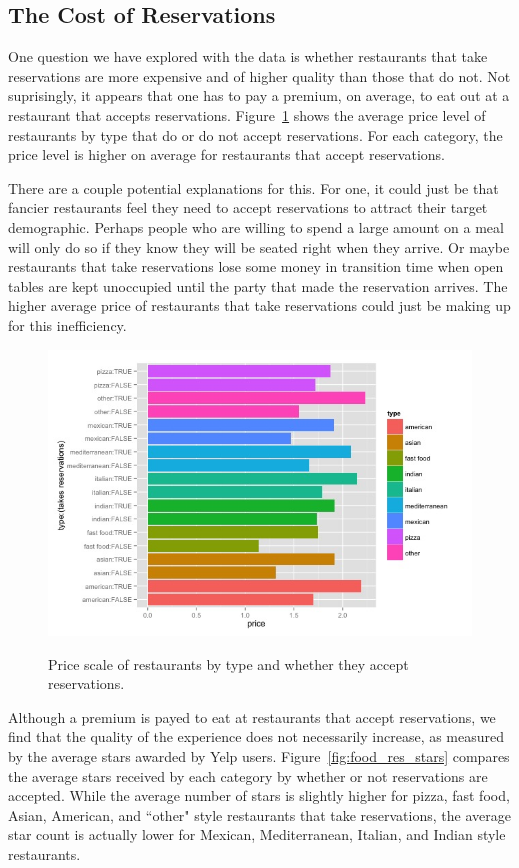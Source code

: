 \documentclass[11pt]{article}
\begin{document}
\subsection{The Cost of Reservations}

One question we have explored with the data is whether restaurants that take reservations are more expensive and of higher quality than those that do not. Not suprisingly, it appears that one has to pay a premium, on average, to eat out at a restaurant that accepts reservations. Figure~\ref{fig:food_res_price} shows the average price level of restaurants by type that do or do not accept reservations. For each category, the price level is higher on average for restaurants that accept reservations.

There are a couple potential explanations for this. For one, it could just be that fancier restaurants feel they need to accept reservations to attract their target demographic. Perhaps people who are willing to spend a large amount on a meal will only do so if they know they will be seated right when they arrive. Or maybe restaurants that take reservations lose some money in transition time when open tables are kept unoccupied until the party that made the reservation arrives. The higher average price of restaurants that take reservations could just be making up for this inefficiency.

\begin{figure}[h]
\caption{Price scale of restaurants by type and whether they accept reservations.}
\centering
\includegraphics[width=0.7\linewidth]{Figures/food_res_price.jpeg}
\label{fig:food_res_price}
\end{figure}

Although a premium is payed to eat at restaurants that accept reservations, we find that the quality of the experience does not necessarily increase, as measured by the average stars awarded by Yelp users. Figure~\ref{fig:food_res_stars} compares the average stars received by each category by whether or not reservations are accepted. While the average number of stars is slightly higher for pizza, fast food, Asian, American, and ``other" style restaurants that take reservations, the average star count is actually lower for Mexican, Mediterranean, Italian, and Indian style restaurants.
\end{document}
